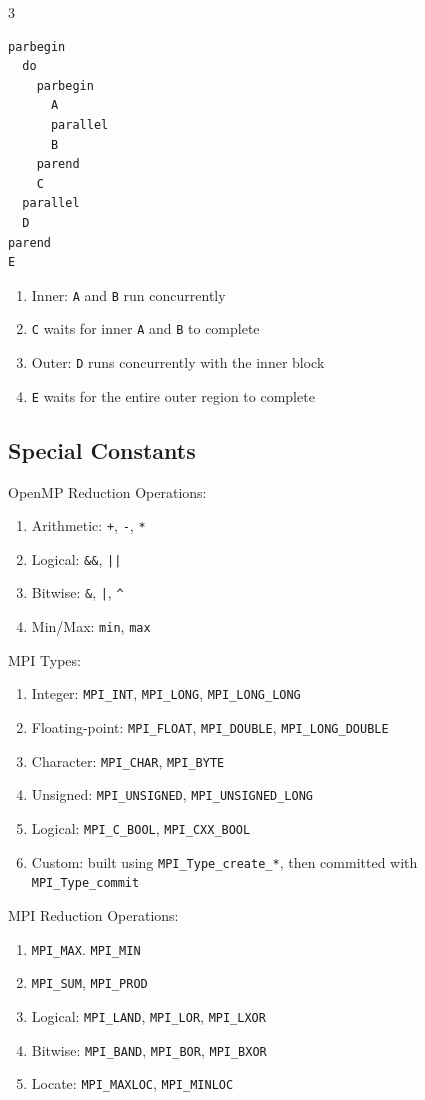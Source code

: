 \documentclass[12pt, a4paper]{article}
\begin{document}
\begin{multicols*}{3}
\begin{lstlisting}[basicstyle=\ttfamily\scriptsize]
parbegin
  do
    parbegin
      A
      parallel
      B
    parend
    C
  parallel
  D
parend
E
\end{lstlisting}

\begin{enumerate}[\roman*.]
  \item Inner: \lstinline|A| and \lstinline|B| run concurrently
  \item \lstinline|C| waits for inner \lstinline|A| and \lstinline|B| to complete
  \item Outer: \lstinline|D| runs concurrently with the inner block
  \item \lstinline|E| waits for the entire outer region to complete
\end{enumerate}

\colbreak
\subsection{Special Constants}
OpenMP Reduction Operations:
\begin{enumerate}[\roman*.]
  \item Arithmetic: \lstinline|+|, \lstinline|-|, \lstinline|*|
  \item Logical: \lstinline|&&|, \lstinline{||}
  \item Bitwise: \lstinline|&|, \lstinline{|}, \lstinline|^|
  \item Min/Max: \lstinline|min|, \lstinline|max|
\end{enumerate}

MPI Types:
\begin{enumerate}[\roman*.]
  \item Integer: \lstinline|MPI_INT|, \lstinline|MPI_LONG|, \lstinline|MPI_LONG_LONG|
  \item Floating-point: \lstinline|MPI_FLOAT|, \lstinline|MPI_DOUBLE|, \lstinline|MPI_LONG_DOUBLE|
  \item Character: \lstinline|MPI_CHAR|, \lstinline|MPI_BYTE|
  \item Unsigned: \lstinline|MPI_UNSIGNED|, \lstinline|MPI_UNSIGNED_LONG|
  \item Logical: \lstinline|MPI_C_BOOL|, \lstinline|MPI_CXX_BOOL|
  \item Custom: built using \lstinline|MPI_Type_create_*|, then committed with \lstinline|MPI_Type_commit|
\end{enumerate}

MPI Reduction Operations:
\begin{enumerate}[\roman*.]
  \item \lstinline|MPI_MAX|. \lstinline|MPI_MIN|
  \item \lstinline|MPI_SUM|, \lstinline|MPI_PROD|
  \item Logical: \lstinline|MPI_LAND|, \lstinline|MPI_LOR|, \lstinline|MPI_LXOR|
  \item Bitwise: \lstinline|MPI_BAND|, \lstinline|MPI_BOR|, \lstinline|MPI_BXOR|
  \item Locate: \lstinline|MPI_MAXLOC|, \lstinline|MPI_MINLOC|
\end{enumerate}


\end{multicols*}
\end{document}
